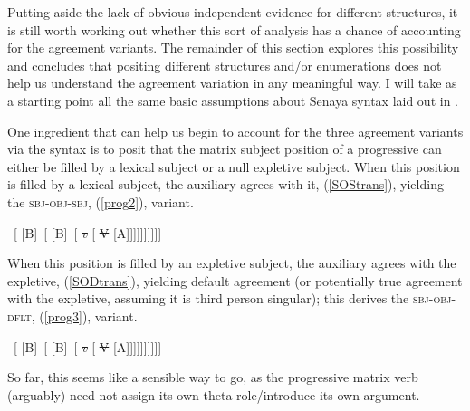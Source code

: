 \documentclass[output=paper
,modfonts
,nonflat]{langsci/langscibook}
\begin{document}
Putting aside the lack of obvious independent evidence for different structures, it is still worth working out whether this sort of analysis has a chance of accounting for the agreement variants. The remainder of this section explores this possibility and concludes that positing different structures and/or enumerations does not help us understand the agreement variation in any meaningful way. I will take as a starting point all the same basic assumptions about Senaya syntax laid out in . 

\noindent One ingredient that can help us begin to account for the three agreement variants via the syntax is to posit that the matrix subject position of a progressive can either be filled by a lexical subject or a null expletive subject. When this position is filled by a lexical subject, the auxiliary agrees with it, (\ref{SOStrans}), yielding the \textsc{sbj-obj-sbj}, (\ref{prog2}), variant.
	
\begin{exe}
		\ex \label{SOStrans}\relax
		[ \ConnectDashTail{SBJ\sub{i}} \ \ConnectDashHead*{V+\textit{v}+Asp+T}\relax\  [ \sout{Asp} [ \sout{\textit{v}} [ \sout{V} [ \ConnectDashTail{T}[A]\relax\  [ [B]\relax\  [ [B]\relax\  [ \sout{\textit{v}} [ \sout{V} [A]\relax ]]]]]]]]]
\end{exe}
	
\noindent When this position is filled by an expletive subject, the auxiliary agrees with the expletive, (\ref{SODtrans}),  yielding default agreement (or potentially true agreement with the expletive, assuming it is third person singular); this derives the \textsc{sbj-obj-dflt}, (\ref{prog3}), variant.

	\begin{exe}
		\ex \label{SODtrans}\relax
		[ \ConnectDashTail{EXPL}\ \ConnectDashHead*{V+\textit{v}+Asp+T}\relax\ [ \sout{Asp} [ \sout{\textit{v}} [ \sout{V} [ \ConnectDashTail{T}[A]\relax\ [ [B]\relax\ [ [B]\relax\ [ \sout{\textit{v}} [ \sout{V} [A]\relax ]]]]]]]]]
	\end{exe}
	
\noindent So far, this seems like a sensible way to go, as the progressive matrix verb (arguably) need not assign its own theta role/introduce its own argument.
\end{document}
